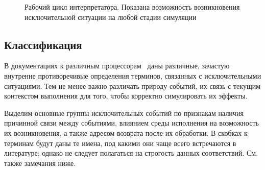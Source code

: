 \begin{figure}[h!tbp]
    \centering
    \caption[Цикл интерпретатора с фазой обработки исключения]{Рабочий цикл интерпретатора. Показана возможность возникновения исключительной ситуации на любой стадии симуляции}
    \label{fig:interp-cycle-expanded-exception}
\end{figure}

\subsection{Классификация}

В документациях к различным процессорам~\cite{intelmanual-7vols, arm-sdg, weaver1994sparc} даны различные, зачастую внутренне противоречивые определения терминов, связанных с исключительными ситуациями. Тем не менее важно различать природу событий, их связь с текущим контекстом выполнения для того, чтобы корректно симулировать их эффекты.

Выделим основные группы исключительных событий по признакам наличия причинной связи между событиями, влиянием среды исполнения на возможность их возникновения, а также адресом возврата после их обработки. В скобках к терминам будут даны те имена, под какими они чаще всего встречаются в литературе; однако не следует полагаться на строгость данных соответствий. См. также замечания ниже.

